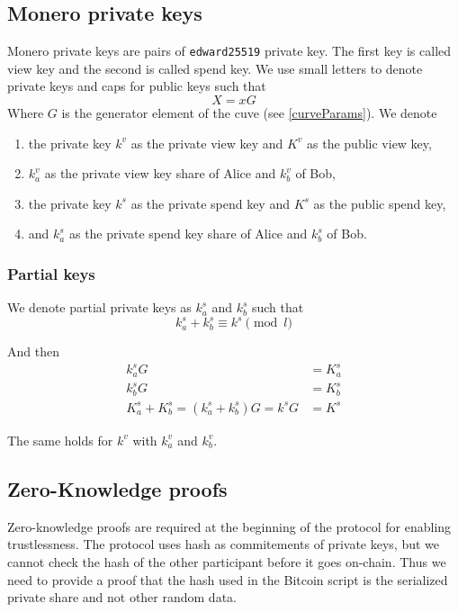 \documentclass{llncs}
\begin{document}
\subsection{Monero private keys}
Monero private keys are pairs of \texttt{edward25519} private key. The first key is called view key and the second is called spend key. We use small letters to denote private keys and caps for public keys such that
$$X = xG$$
Where $G$ is the generator element of the cuve (see \ref{curveParams}). We denote
\begin{enumerate}[label=(\roman*)]
    \item the private key $k^v$ as the private view key and $K^v$ as the public view key,
    \item $k^v_a$ as the private view key share of Alice and $k^v_b$ of Bob,
    \item the private key $k^s$ as the private spend key and $K^s$ as the public spend key,
    \item and $k^s_a$ as the private spend key share of Alice and $k^s_b$ of Bob.
\end{enumerate}

\subsubsection{Partial keys}
We denote partial private keys as $k^s_a$ and $k^s_b$ such that
$$k^s_a + k^s_b \equiv k^s \pmod l$$

And then
\begin{equation}
\begin{split}
    k^s_aG &= K^s_a \\
    k^s_bG &= K^s_b \\
    K^s_a + K^s_b = (k^s_a + k^s_b)G = k^sG &= K^s
\end{split}
\end{equation}

The same holds for $k^v$ with $k^v_a$ and $k^v_b$.

\subsection{Zero-Knowledge proofs}
Zero-knowledge proofs are required at the beginning of the protocol for enabling trustlessness. The protocol uses hash as commitements of private keys, but we cannot check the hash of the other participant before it goes on-chain. Thus we need to provide a proof that the hash used in the Bitcoin script is the serialized private share and not other random data.
\end{document}
